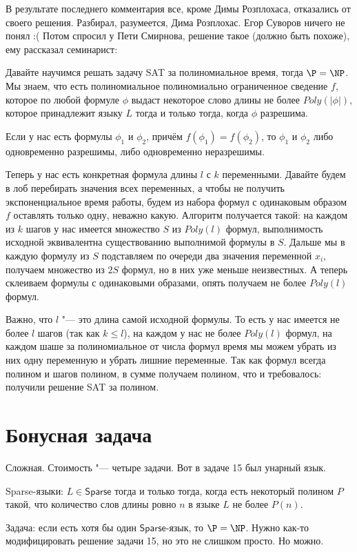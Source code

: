 	В результате последнего комментария все, кроме Димы Розплохаса, отказались от своего решения.
	Разбирал, разумеется, Дима Розплохас.
	Егор Суворов ничего не понял :(
	Потом спросил у Пети Смирнова, решение такое (должно быть похоже), ему рассказал семинарист:

	Давайте научимся решать задачу SAT за полиномиальное время, тогда $\P=\NP$.
	Мы знаем, что есть полиномиальное полиномиально ограниченное сведение $f$,
	которое по любой формуле $\phi$ выдаст некоторое слово длины не более $Poly(|\phi|)$,
	которое принадлежит языку $L$ тогда и только тогда, когда $\phi$ разрешима.
	\begin{assertion}
		Если у нас есть формулы $\phi_1$ и $\phi_2$, причём $f(\phi_1) = f(\phi_2)$,
		то $\phi_1$ и $\phi_2$ либо одновременно разрешимы, либо одновременно неразрешимы.
	\end{assertion}
	Теперь у нас есть конкретная формула длины $l$ с $k$ переменными.
	Давайте будем в лоб перебирать значения всех переменных, а чтобы не получить экспоненциальное
	время работы, будем из набора формул с одинаковым образом $f$ оставлять только одну, неважно какую.
	Алгоритм получается такой: на каждом из $k$ шагов у нас имеется множество $S$ из $Poly(l)$
	формул, выполнимость исходной эквивалентна существованию выполнимой формулы в $S$.
	Дальше мы в каждую формулу из $S$ подставляем по очереди два значения переменной $x_i$,
	получаем множество из $2S$ формул, но в них уже меньше неизвестных.
	А теперь склеиваем формулы с одинаковыми образами, опять получаем не более $Poly(l)$ формул.

	Важно, что $l$ "--- это длина самой исходной формулы.
	То есть у нас имеется не более $l$ шагов (так как $k \le l$), на каждом у нас не более
	$Poly(l)$ формул, на каждом шаше за полиномиальное от числа формул время мы можем убрать из
	них одну переменную и убрать лишние переменные.
	Так как формул всегда полином и шагов полином, в сумме получаем полином, что и требовалось:
	получили решение SAT за полином.

\section{Бонусная задача}
	Сложная. Стоимость "--- четыре задачи.
	Вот в задаче 15 был унарный язык.
	\begin{Def}
		Sparse-языки: $L \in \mathsf{Sparse}$ тогда и только тогда, когда есть некоторый
		полином $P$ такой, что количество слов длины ровно $n$ в языке $L$ не более
		$P(n)$.
	\end{Def}
	Задача: если есть хотя бы один $\mathsf{Sparse}$-язык, то $\P=\NP$.
	Нужно как-то модифицировать решение задачи 15, но это не слишком просто.
	Но можно.
